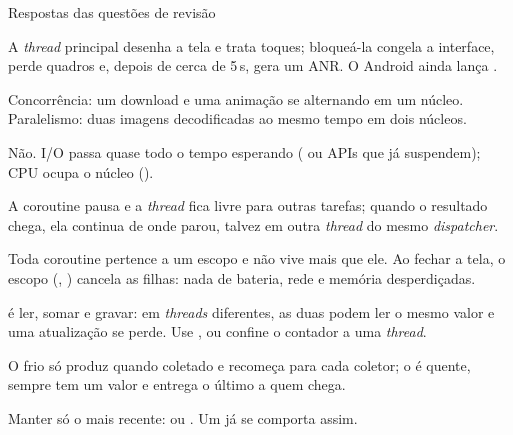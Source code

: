 \documentclass[aspectratio=169,10pt]{beamer}
\begin{document}
\begin{frame}{Respostas das questões de revisão}
  \begin{respostas}
    \item A \emph{thread} principal desenha a tela e trata toques; bloqueá-la congela a interface, perde quadros e, depois de cerca de 5\,s, gera um ANR. O Android ainda lança .
    \item Concorrência: um download e uma animação se alternando em um núcleo. Paralelismo: duas imagens decodificadas ao mesmo tempo em dois núcleos.
    \item Não. I/O passa quase todo o tempo esperando ( ou APIs que já suspendem); CPU ocupa o núcleo ().
    \item A coroutine pausa e a \emph{thread} fica livre para outras tarefas; quando o resultado chega, ela continua de onde parou, talvez em outra \emph{thread} do mesmo \emph{dispatcher}.
    \item Toda coroutine pertence a um escopo e não vive mais que ele. Ao fechar a tela, o escopo (, ) cancela as filhas: nada de bateria, rede e memória desperdiçadas.
    \item {} é ler, somar e gravar: em \emph{threads} diferentes, as duas podem ler o mesmo valor e uma atualização se perde. Use ,  ou confine o contador a uma \emph{thread}.
    \item O  frio só produz quando coletado e recomeça para cada coletor; o  é quente, sempre tem um valor e entrega o último a quem chega.
    \item Manter só o mais recente:  ou . Um  já se comporta assim.
  \end{respostas}
\end{frame}

\end{document}
